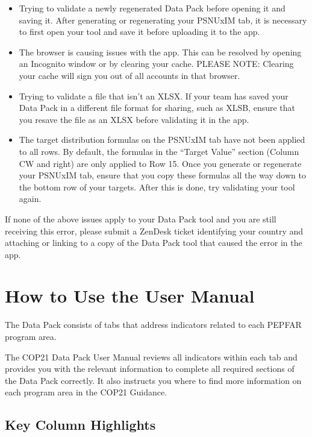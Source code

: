 \documentclass[
  openany]{book}
\providecommand{\tightlist}{%
  \setlength{\itemsep}{0pt}\setlength{\parskip}{0pt}}
\begin{document}
\begin{itemize}
\tightlist
\item
  Trying to validate a newly regenerated Data Pack before opening it and saving it. After generating or regenerating your PSNUxIM tab, it is necessary to first open your tool and save it before uploading it to the app.
\item
  The browser is causing issues with the app. This can be resolved by opening an Incognito window or by clearing your cache. PLEASE NOTE: Clearing your cache will sign you out of all accounts in that browser.
\item
  Trying to validate a file that isn't an XLSX. If your team has saved your Data Pack in a different file format for sharing, such as XLSB, ensure that you resave the file as an XLSX before validating it in the app.
\item
  The target distribution formulas on the PSNUxIM tab have not been applied to all rows. By default, the formulas in the ``Target Value'' section (Column CW and right) are only applied to Row 15. Once you generate or regenerate your PSNUxIM tab, ensure that you copy these formulas all the way down to the bottom row of your targets. After this is done, try validating your tool again.
\end{itemize}

If none of the above issues apply to your Data Pack tool and you are still receiving this error, please submit a ZenDesk ticket identifying your country and attaching or linking to a copy of the Data Pack tool that caused the error in the app.

\hypertarget{how-to-use-the-user-manual}{%
\chapter{How to Use the User Manual}\label{how-to-use-the-user-manual}}

The Data Pack consists of tabs that address indicators related to each
PEPFAR program area.

The COP21 Data Pack User Manual reviews all indicators within each tab
and provides you with the relevant information to complete all required
sections of the Data Pack correctly. It also instructs you where to find
more information on each program area in the COP21 Guidance.

\hypertarget{key-column-highlights}{%
\section{Key Column Highlights}\label{key-column-highlights}}
\end{document}
